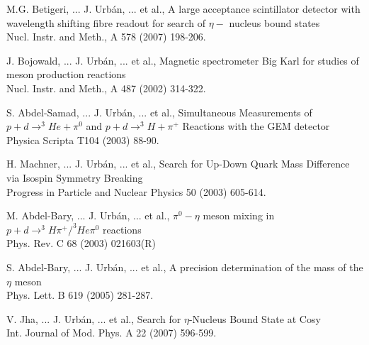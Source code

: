 \documentclass[12pt,oneside,slovak]{book}
\begin{document}
{ %
  \renewcommand{\bibname}{Zoznam priloženej literatúry}
  \makeatletter
  \renewcommand{\@biblabel}[1]{[\Roman{enumiv}]\indent\indent}
  \makeatother
  \begin{thebibliography}{VIII}  %

    M.G. Betigeri, ... J. Urbán, ... et al., A large acceptance scintillator
    detector with wavelength shifting fibre readout for search of $\eta-$
    nucleus bound states \\
    Nucl. Instr. and Meth., A 578 (2007) 198-206.

    J. Bojowald, ... J. Urbán, ... et al., Magnetic spectrometer Big Karl for
    studies of meson production reactions \\
    Nucl. Instr. and Meth., A 487 (2002) 314-322.

    S. Abdel-Samad, ... J. Urbán, ... et al., Simultaneous Measurements of $p+d
    \rightarrow ^{3}He + \pi^{0}$ and $p+d \rightarrow ^{3}H + \pi^{+}$
    Reactions with the GEM detector \\
    Physica Scripta T104 (2003) 88-90.

    H. Machner, ... J. Urbán, ... et al., Search for Up-Down Quark Mass
    Difference via Isospin Symmetry Breaking \\
    Progress in Particle and Nuclear Physics 50 (2003) 605-614.

    M. Abdel-Bary, ... J. Urbán, ... et al.,
    $\pi^{0}-\eta$ meson mixing in $p+d \rightarrow ^{3}H\pi^{+}/^{3}He\pi^{0}$
    reactions \\
    Phys. Rev. C 68 (2003) 021603(R)

    S. Abdel-Bary, ... J. Urbán, ... et al., A precision determination of the
    mass of the $\eta$ meson\\
    Phys. Lett. B 619 (2005) 281-287.

    V. Jha,  ... J. Urbán, ... et al., Search for $\eta$-Nucleus Bound State at
    Cosy \\
    Int. Journal of Mod. Phys. A 22 (2007) 596-599.

  \end{thebibliography}
} %


\renewcommand{\bibname}{Zoznam použitej literatúry}
\end{document}
